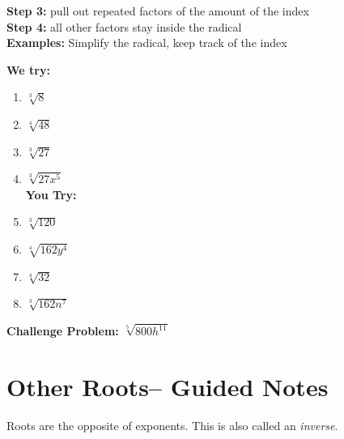 \documentclass[12pt]{article}
\begin{document}
\textbf{Step 3:} pull out repeated factors of the amount of the index\\

\textbf{Step 4:} all other factors stay inside the radical\\

\textbf{Examples:} Simplify the radical, keep track of the index\\

\begin{multicols}{2}
\textbf{We try:}\\

\begin{enumerate}
	\setlength\itemsep{1cm}

	\item $\sqrt[3]{8}$\\
	
	
	\item $\sqrt[4]{48}$\\
	
	
	\item $\sqrt[3]{27}$\\
	
	
	\item $\sqrt[3]{27x^5}$\\
	
		
\textbf{You Try:}\\
	
	\item  $\sqrt[3]{120}$ \\
	
	
	\item $\sqrt[4]{162y^4}$\\
	
	
	\item $\sqrt[4]{32}$\\
	
	
	\item $\sqrt[3]{162n^7}$\\
	
	

\end{enumerate}
\end{multicols}

 \textbf{Challenge Problem:} $\sqrt[5]{800h^{11}}$
 
 \section{Other Roots-- Guided Notes}

Roots are the opposite of exponents. This is also called an \textit{inverse}.\\
\end{document}
